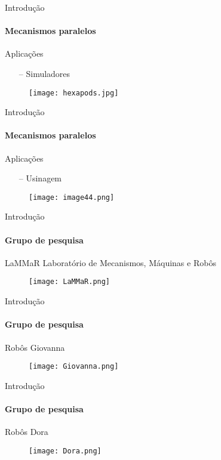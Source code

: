 \documentclass[25pt,landscape]{beamer}
\begin{document}
\begin{frame}{Introdução}
    \framesubtitle{Mecanismos paralelos}
    \begin{block}{Aplica\c{c}\~oes}
        \begin{itemize}
            \item[--] Simuladores
        \end{itemize}
    \end{block}
    \begin{figure}[!h]
        \centering
        \texttt{[image: hexapods.jpg]}
    \end{figure}  
\end{frame}

\begin{frame}{Introdução}
    \framesubtitle{Mecanismos paralelos}
    \begin{block}{Aplica\c{c}\~oes}
        \begin{itemize}
            \item[--] Usinagem
        \end{itemize}
    \end{block}
    \begin{figure}[!h]
        \centering
        \texttt{[image: image44.png]}
    \end{figure}  
\end{frame}


\begin{frame}{Introdução}
	\framesubtitle{Grupo de pesquisa}
	\pause
	\begin{block}{LaMMaR}
		Laborat\'orio de Mecanismos, M\'aquinas e Rob\^os
    \end{block}
    \begin{figure}[!h]
        \centering
        \texttt{[image: LaMMaR.png]}
    \end{figure}
\end{frame}

\begin{frame}{Introdução}
	\framesubtitle{Grupo de pesquisa}
	\begin{block}{Rob\^os}
		Giovanna
    \end{block}
    \begin{figure}[!h]
        \centering
        \texttt{[image: Giovanna.png]}
    \end{figure}
\end{frame}

\begin{frame}{Introdução}
	\framesubtitle{Grupo de pesquisa}
	\begin{block}{Rob\^os}
		Dora
    \end{block}
    \begin{figure}[!h]
        \centering
        \texttt{[image: Dora.png]}
    \end{figure}
\end{frame}
\end{document}
